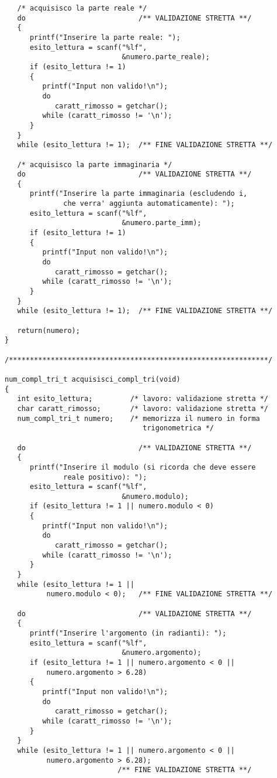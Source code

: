 \documentclass[a4paper,10pt]{article}
\begin{document}
\begin{verbatim}
   /* acquisisco la parte reale */
   do                           /** VALIDAZIONE STRETTA **/
   {
      printf("Inserire la parte reale: ");
      esito_lettura = scanf("%lf",
                            &numero.parte_reale);
      if (esito_lettura != 1)
      {
         printf("Input non valido!\n");
         do
            caratt_rimosso = getchar();
         while (caratt_rimosso != '\n');
      }
   }
   while (esito_lettura != 1);  /** FINE VALIDAZIONE STRETTA **/

   /* acquisisco la parte immaginaria */
   do                           /** VALIDAZIONE STRETTA **/
   {
      printf("Inserire la parte immaginaria (escludendo i,
              che verra' aggiunta automaticamente): ");
      esito_lettura = scanf("%lf",
                            &numero.parte_imm);
      if (esito_lettura != 1)
      {
         printf("Input non valido!\n");
         do
            caratt_rimosso = getchar();
         while (caratt_rimosso != '\n');
      }
   }
   while (esito_lettura != 1);  /** FINE VALIDAZIONE STRETTA **/

   return(numero);
}

/**************************************************************/

num_compl_tri_t acquisisci_compl_tri(void)
{
   int esito_lettura;         /* lavoro: validazione stretta */
   char caratt_rimosso;       /* lavoro: validazione stretta */
   num_compl_tri_t numero;    /* memorizza il numero in forma
                                 trigonometrica */

   do                           /** VALIDAZIONE STRETTA **/
   {
      printf("Inserire il modulo (si ricorda che deve essere
              reale positivo): ");
      esito_lettura = scanf("%lf",
                            &numero.modulo);
      if (esito_lettura != 1 || numero.modulo < 0)
      {
         printf("Input non valido!\n");
         do
            caratt_rimosso = getchar();
         while (caratt_rimosso != '\n');
      }
   }
   while (esito_lettura != 1 ||
          numero.modulo < 0);   /** FINE VALIDAZIONE STRETTA **/

   do                           /** VALIDAZIONE STRETTA **/
   {
      printf("Inserire l'argomento (in radianti): ");
      esito_lettura = scanf("%lf",
                            &numero.argomento);
      if (esito_lettura != 1 || numero.argomento < 0 ||
          numero.argomento > 6.28)
      {
         printf("Input non valido!\n");
         do
            caratt_rimosso = getchar();
         while (caratt_rimosso != '\n');
      }
   }
   while (esito_lettura != 1 || numero.argomento < 0 ||
          numero.argomento > 6.28);
                           /** FINE VALIDAZIONE STRETTA **/


\end{verbatim}
\end{document}
